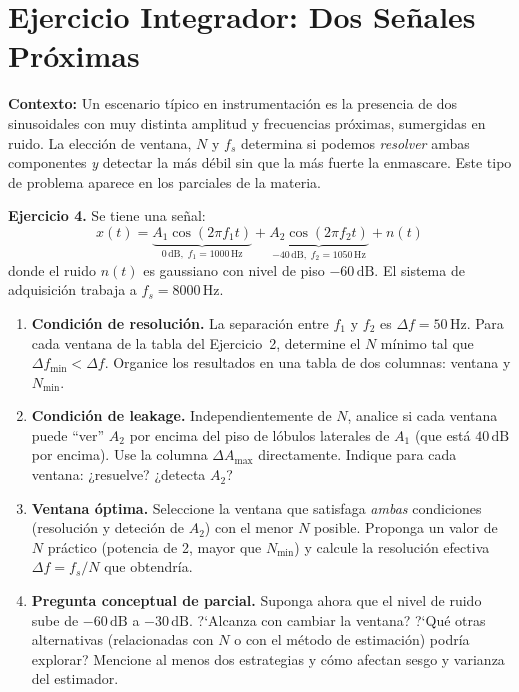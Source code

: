 \documentclass[11pt, a4paper]{article}
\begin{document}
\section{Ejercicio Integrador: Dos Se\~nales Pr\'oximas}

\begin{hintbox}
\textbf{Contexto:}
Un escenario t\'ipico en instrumentaci\'on es la presencia de dos sinusoidales
con muy distinta amplitud y frecuencias pr\'oximas, sumergidas en ruido.
La elecci\'on de ventana, $N$ y $f_s$ determina si podemos
\emph{resolver} ambas componentes \emph{y} detectar la m\'as d\'ebil sin que la m\'as
fuerte la enmascare. Este tipo de problema aparece en los parciales de la materia.
\end{hintbox}

\begin{exbox}
\textbf{Ejercicio 4.}
Se tiene una se\~nal:
$$x(t) = \underbrace{A_1\cos(2\pi f_1 t)}_{0\,\text{dB},\; f_1=1000\,\text{Hz}}
       + \underbrace{A_2\cos(2\pi f_2 t)}_{-40\,\text{dB},\; f_2=1050\,\text{Hz}}
       + n(t)$$
donde el ruido $n(t)$ es gaussiano con nivel de piso $-60\,\text{dB}$.
El sistema de adquisici\'on trabaja a $f_s = 8000\,\text{Hz}$.

\begin{enumerate}[label=\textbf{\alph*)}]

  \item \textbf{Condici\'on de resoluci\'on.}
  La separaci\'on entre $f_1$ y $f_2$ es $\Delta f = 50\,\text{Hz}$.
  Para cada ventana de la tabla del Ejercicio~2, determine el $N$ m\'inimo
  tal que $\Delta f_{\min} < \Delta f$.
  Organice los resultados en una tabla de dos columnas: ventana y $N_{\min}$.

  \item \textbf{Condici\'on de leakage.}
  Independientemente de $N$, analice si cada ventana puede ``ver'' $A_2$ por encima
  del piso de l\'obulos laterales de $A_1$ (que est\'a $40\,\text{dB}$ por encima).
  Use la columna $\Delta A_{\max}$ directamente.
  Indique para cada ventana: ¿resuelve? ¿detecta $A_2$?

  \item \textbf{Ventana \'optima.}
  Seleccione la ventana que satisfaga \emph{ambas} condiciones
  (resoluci\'on y deteci\'on de $A_2$) con el menor $N$ posible.
  Proponga un valor de $N$ pr\'actico (potencia de 2, mayor que $N_{\min}$)
  y calcule la resoluci\'on efectiva $\Delta f = f_s / N$ que obtendr\'ia.

  \item \textbf{Pregunta conceptual de parcial.}
  Suponga ahora que el nivel de ruido sube de $-60\,\text{dB}$ a $-30\,\text{dB}$.
  ?`Alcanza con cambiar la ventana? ?`Qu\'e otras alternativas (relacionadas con $N$
  o con el m\'etodo de estimaci\'on) podr\'ia explorar?
  Mencione al menos dos estrategias y c\'omo afectan sesgo y varianza del estimador.

\end{enumerate}
\end{exbox}
\end{document}
